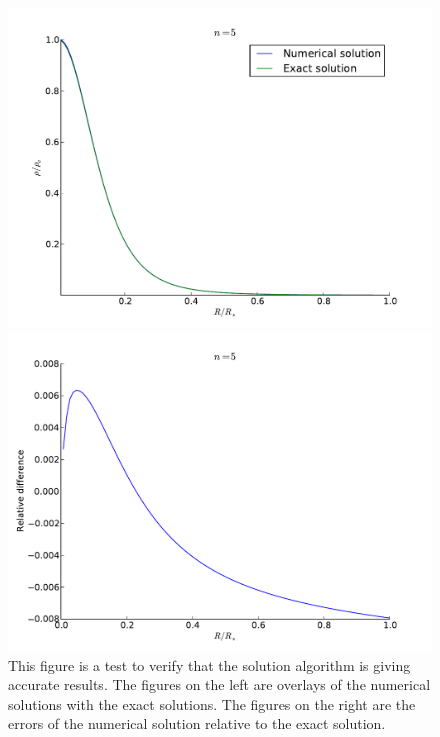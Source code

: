 \documentclass[11pt,letterpaper]{article}
\begin{document}
\begin{figure}
\begin{minipage}[t]{0.496\textwidth}
        \includegraphics[width=\textwidth]{figures/poly5.pdf}
    \end{minipage}
    \begin{minipage}[t]{0.496\textwidth}
        \centering
        \includegraphics[width=\textwidth]{figures/poly5_err.pdf}
    \end{minipage}
    \caption{This figure is a test to verify that the solution algorithm is
    giving accurate results. The figures on the left are overlays of the
    numerical solutions with the exact solutions. The figures on the right are
    the errors of the numerical solution relative to the exact solution.}
    \label{exact_sols}
\end{figure}
\end{document}
